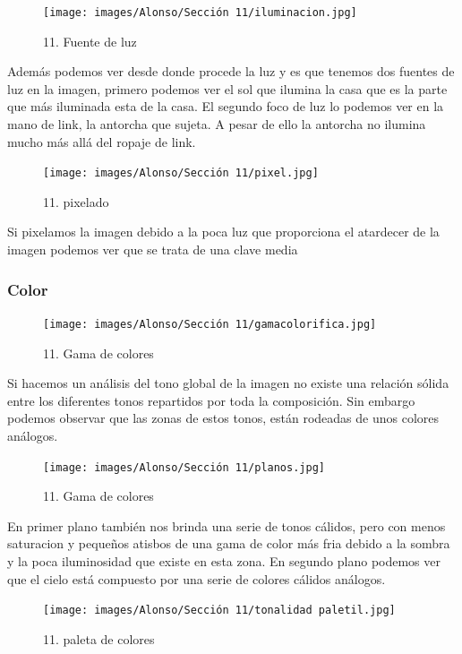 \documentclass[12pt]{article}
\begin{document}
    \begin{figure}[H]
      \centering
      \texttt{[image: images/Alonso/Sección 11/iluminacion.jpg]}
      \caption{\small 11. Fuente de luz}
    \end{figure}

    Además podemos ver desde donde procede la luz y es que tenemos dos fuentes de luz en la imagen, primero podemos ver el sol que ilumina la casa que es la parte que más iluminada esta de la casa. El segundo foco de luz lo podemos ver en la mano de link, la antorcha que sujeta. A pesar de ello la antorcha no ilumina mucho más allá del ropaje de link.

\begin{figure}[H]
      \centering
      \texttt{[image: images/Alonso/Sección 11/pixel.jpg]}
      \caption{\small 11. pixelado}
    \end{figure}

    Si pixelamos la imagen debido a la poca luz que proporciona el atardecer de la imagen podemos ver que se trata de una clave media

        \subsubsection{Color}
\begin{figure}[H]
      \centering
      \texttt{[image: images/Alonso/Sección 11/gamacolorifica.jpg]}
      \caption{\small 11. Gama de colores}
    \end{figure}

        Si hacemos un análisis del tono global de la imagen no existe una relación sólida entre los diferentes tonos repartidos por toda la composición. Sin embargo podemos observar que las zonas de estos tonos, están rodeadas de unos colores análogos.

        \begin{figure}[H]
      \centering
      \texttt{[image: images/Alonso/Sección 11/planos.jpg]}
      \caption{\small 11. Gama de colores}
    \end{figure}
    En primer plano también nos brinda una serie de tonos cálidos, pero con menos saturacion y pequeños atisbos de una gama de color más fria debido a la sombra y la poca iluminosidad que existe en esta zona. En segundo plano  podemos ver que el cielo está compuesto por una serie de colores cálidos análogos.

    \begin{figure}[H]
      \centering
      \texttt{[image: images/Alonso/Sección 11/tonalidad paletil.jpg]}
      \caption{\small 11. paleta de colores}
    \end{figure}
\end{document}
